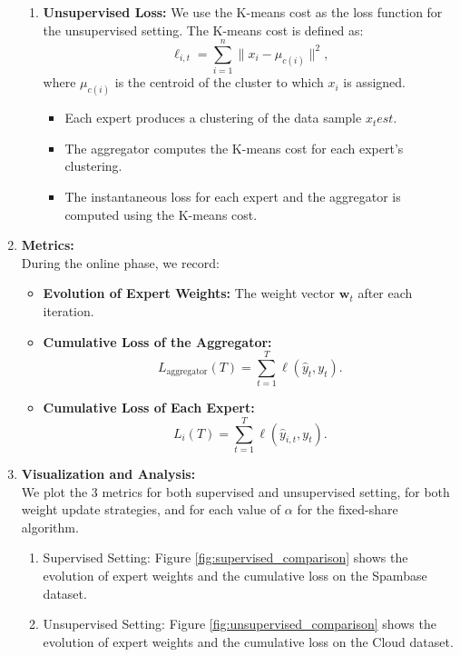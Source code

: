 \documentclass{article}
\begin{document}
\begin{enumerate}
\begin{enumerate}
      \item \textbf{Unsupervised Loss:} We use the K-means cost as the loss function for the unsupervised setting. The K-means cost is defined as:
      \[
      \ell_{i,t} = \sum_{i=1}^{n} \| x_i - \mu_{c(i)} \|^2,
      \]
      where $\mu_{c(i)}$ is the centroid of the cluster to which $x_i$ is assigned.
      \begin{itemize}
        \item Each expert produces a clustering of the data sample $x_test$.
        \item The aggregator computes the K-means cost for each expert's clustering.
        \item The instantaneous loss for each expert and the aggregator is computed using the K-means cost.
      \end{itemize}
      \end{enumerate}
    
    \item \textbf{Metrics:} \\
    During the online phase, we record:
    \begin{itemize}
        \item \textbf{Evolution of Expert Weights:} The weight vector $\mathbf{w}_t$ after each iteration.
        \item \textbf{Cumulative Loss of the Aggregator:}
        \[
        L_{\text{aggregator}}(T) = \sum_{t=1}^{T} \ell(\hat{y}_t, y_t).
        \]
        \item \textbf{Cumulative Loss of Each Expert:}
        \[
        L_i(T) = \sum_{t=1}^{T} \ell(\hat{y}_{i,t}, y_t).
        \]
    \end{itemize}
    \item \textbf{Visualization and Analysis:} \\
    We plot the 3 metrics for both supervised and unsupervised setting, for both weight update strategies, and for each value of $\alpha$ for the fixed-share algorithm. 
    \begin{enumerate}
      \item Supervised Setting: Figure \ref{fig:supervised_comparison} shows the evolution of expert weights and the cumulative loss on the Spambase dataset.
      \item Unsupervised Setting: Figure \ref{fig:unsupervised_comparison} shows the evolution of expert weights and the cumulative loss on the Cloud dataset.
    \end{enumerate}

    \end{enumerate}
\end{document}
